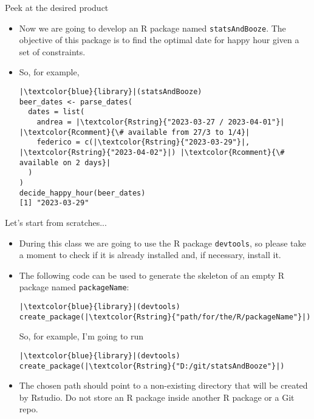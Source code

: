 \documentclass[
hyperref={bookmarks=false},
xcolor={dvipsnames,svgnames*,x11names*}, 
12pt
]{beamer}
\begin{document}
\begin{frame}[fragile]{Peek at the desired product}
\vspace{-0.5cm}
\begin{itemize}
\itemsep 2ex
\item Now we are going to develop an R package named \texttt{statsAndBooze}. The objective of this package is to find the optimal date for happy hour given a set of constraints. 
\item So, for example, 
\begin{lstlisting}
|\textcolor{blue}{library}|(statsAndBooze)
beer_dates <- parse_dates(
  dates = list(
    andrea = |\textcolor{Rstring}{"2023-03-27 / 2023-04-01"}| |\textcolor{Rcomment}{\# available from 27/3 to 1/4}|
    federico = c(|\textcolor{Rstring}{"2023-03-29"}|, |\textcolor{Rstring}{"2023-04-02"}|) |\textcolor{Rcomment}{\# available on 2 days}|
  )
)
decide_happy_hour(beer_dates)
[1] "2023-03-29"
\end{lstlisting}
\end{itemize}
\end{frame}

\begin{frame}[fragile]{Let's start from scratches...}
\vspace{-0.5cm}
\begin{itemize}
\itemsep 2ex
\item During this class we are going to use the R package \texttt{devtools}, so please take a moment to check if it is already installed and, if necessary, install it. 
\item The following code can be used to generate the skeleton of an empty R package named \texttt{packageName}:
\begin{lstlisting}
|\textcolor{blue}{library}|(devtools)
create_package(|\textcolor{Rstring}{"path/for/the/R/packageName"}|)
\end{lstlisting}
So, for example, I'm going to run
\begin{lstlisting}
|\textcolor{blue}{library}|(devtools)
create_package(|\textcolor{Rstring}{"D:/git/statsAndBooze"}|)
\end{lstlisting}
\item The chosen path should point to a non-existing directory that will be created by Rstudio. Do not store an R package inside another R package or a Git repo. 
\end{itemize}
\end{frame}
\end{document}
